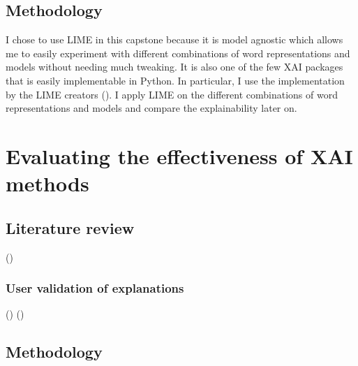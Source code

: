 \subsection{Methodology}
I chose to use LIME in this capstone because it is model agnostic which allows me to easily experiment with different combinations of word representations and models without needing much tweaking. It is also one of the few XAI packages that is easily implementable in Python. In particular, I use the implementation by the LIME creators (\cite{lime_github}). I apply LIME on the different combinations of word representations and models and compare the explainability later on.

\section{Evaluating the effectiveness of XAI methods}
\subsection{Literature review}
(\cite{doshi-velez2017})
\subsubsection{User validation of explanations}
(\cite{gorski2021})
(\cite{rosenfeld2021})
\subsection{Methodology}
